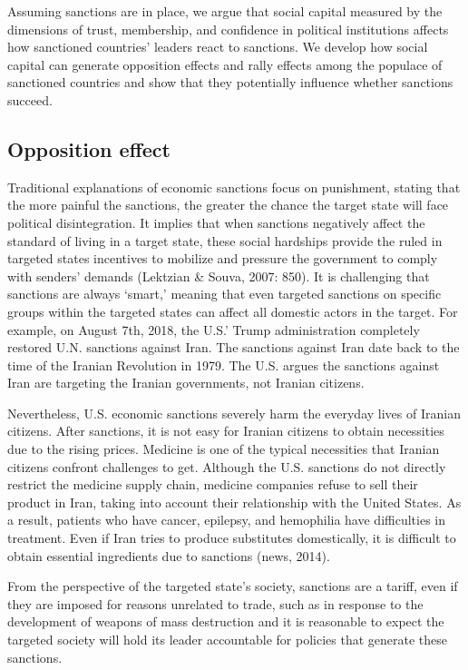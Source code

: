 \documentclass[
  english,
  man]{apa6}
\begin{document}
Assuming sanctions are in place, we argue that social capital measured by the dimensions of trust, membership, and confidence in political institutions affects how sanctioned countries' leaders react to sanctions. We develop how social capital can generate opposition effects and rally effects among the populace of sanctioned countries and show that they potentially influence whether sanctions succeed.

\hypertarget{opposition-effect}{%
\subsection{Opposition effect}\label{opposition-effect}}

Traditional explanations of economic sanctions focus on punishment, stating that the more painful the sanctions, the greater the chance the target state will face political disintegration. It implies that when sanctions negatively affect the standard of living in a target state, these social hardships provide the ruled in targeted states incentives to mobilize and pressure the government to comply with senders' demands (Lektzian \& Souva, 2007: 850). It is challenging that sanctions are always `smart,' meaning that even targeted sanctions on specific groups within the targeted states can affect all domestic actors in the target. For example, on August 7th, 2018, the U.S.' Trump administration completely restored U.N. sanctions against Iran. The sanctions against Iran date back to the time of the Iranian Revolution in 1979. The U.S. argues the sanctions against Iran are targeting the Iranian governments, not Iranian citizens.

Nevertheless, U.S. economic sanctions severely harm the everyday lives of Iranian citizens. After sanctions, it is not easy for Iranian citizens to obtain necessities due to the rising prices. Medicine is one of the typical necessities that Iranian citizens confront challenges to get. Although the U.S. sanctions do not directly restrict the medicine supply chain, medicine companies refuse to sell their product in Iran, taking into account their relationship with the United States. As a result, patients who have cancer, epilepsy, and hemophilia have difficulties in treatment. Even if Iran tries to produce substitutes domestically, it is difficult to obtain essential ingredients due to sanctions (news, 2014).

From the perspective of the targeted state's society, sanctions are a tariff, even if they are imposed for reasons unrelated to trade, such as in response to the development of weapons of mass destruction and it is reasonable to expect the targeted society will hold its leader accountable for policies that generate these sanctions.
\end{document}
